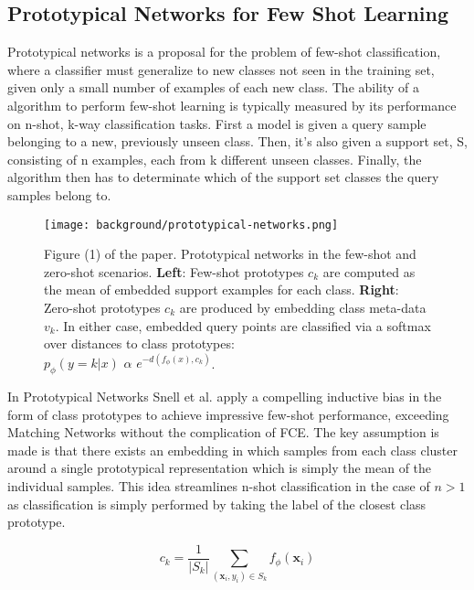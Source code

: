 \subsection{Prototypical Networks for Few Shot Learning}

Prototypical networks is a proposal for the problem of few-shot classification, where a classifier must generalize to new classes not seen in the training set, given only a small number of examples of each new class. The ability of a algorithm to perform few-shot learning is typically measured by its performance on n-shot, k-way classification tasks. First a model is given a query sample belonging to a new, previously unseen class. Then, it’s also given a support set, S, consisting of n examples, each from k different unseen classes. Finally, the algorithm then has to determinate which of the support set classes the query samples belong to.

\begin{figure}[H]
    \centering
        \texttt{[image: background/prototypical-networks.png]}
    \caption{Figure (1) of the paper. Prototypical networks in the few-shot and zero-shot scenarios. \textbf{Left}: Few-shot prototypes $c_k$ are computed as the mean of embedded support examples for each class. \textbf{Right}: Zero-shot prototypes $c_k$ are produced by embedding class meta-data $v_k$. In either case, embedded query points are classified via a softmax over distances to class prototypes: \\ $p_{\phi}(y = k|x)$ $\alpha$ $e^{−d(f_{\phi}(x), c_k)}$.}
    \label{figure:background:prototypical}
\end{figure}

In Prototypical Networks \cite{protonet} Snell et al. apply a compelling inductive bias in the form of class prototypes to achieve impressive few-shot performance, exceeding Matching Networks \cite{matchingnet} without the complication of FCE. The key assumption is made is that there exists an embedding in which samples from each class cluster around a single prototypical representation which is simply the mean of the individual samples. This idea streamlines n-shot classification in the case of $n > 1$ as classification is simply performed by taking the label of the closest class prototype.

\begin{equation}
    c_k = \frac{1}{|S_k|} \sum_{(\mathbf{x}_i, y_i) \in S_k} f_{\phi}(\mathbf{x}_i)
\end{equation}

